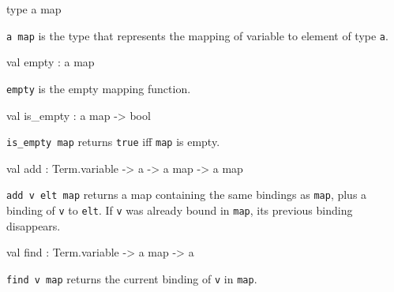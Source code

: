 \begin{ocamldocsigend}


\label{type:Term.VariableMap.map}\begin{ocamldoccode}
type {\textquotesingle}a map 
\end{ocamldoccode}
\begin{ocamldocdescription}
{\tt{{\textquotesingle}a map}} is the type that represents the mapping of variable to element of type {\tt{{\textquotesingle}a}}.


\end{ocamldocdescription}


\label{val:Term.VariableMap.empty}\begin{ocamldoccode}
val empty : {\textquotesingle}a map
\end{ocamldoccode}
\begin{ocamldocdescription}
{\tt{empty}} is the empty mapping function.


\end{ocamldocdescription}


\label{val:Term.VariableMap.is-underscoreempty}\begin{ocamldoccode}
val is_empty : {\textquotesingle}a map -> bool
\end{ocamldoccode}
\begin{ocamldocdescription}
{\tt{is\_empty map}} returns {\tt{true}} iff {\tt{map}} is empty.


\end{ocamldocdescription}


\label{val:Term.VariableMap.add}\begin{ocamldoccode}
val add : Term.variable -> {\textquotesingle}a -> {\textquotesingle}a map -> {\textquotesingle}a map
\end{ocamldoccode}
\begin{ocamldocdescription}
{\tt{add v elt map}} returns a map containing the same bindings as {\tt{map}}, 
      plus a binding of {\tt{v}} to {\tt{elt}}. If {\tt{v}} was already bound in {\tt{map}}, 
      its previous binding disappears.


\end{ocamldocdescription}


\label{val:Term.VariableMap.find}\begin{ocamldoccode}
val find : Term.variable -> {\textquotesingle}a map -> {\textquotesingle}a
\end{ocamldoccode}
\begin{ocamldocdescription}
{\tt{find v map}} returns the current binding of {\tt{v}} in {\tt{map}}.


\end{ocamldocdescription}
\end{ocamldocsigend}
